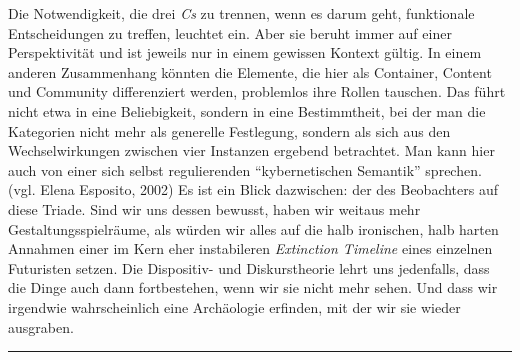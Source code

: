 \documentclass[output=paper]{langscibook}
\begin{document}
Die Notwendigkeit, die drei \emph{Cs} zu trennen, wenn es darum geht,
funktionale Entscheidungen zu treffen, leuchtet ein. Aber sie beruht
immer auf einer Perspektivität und ist jeweils nur in einem gewissen
Kontext gültig. In einem anderen Zusammenhang könnten die Elemente, die
hier als Container, Content und Community differenziert werden,
problemlos ihre Rollen tauschen. Das führt nicht etwa in eine
Beliebigkeit, sondern in eine Bestimmtheit, bei der man die Kategorien
nicht mehr als generelle Festlegung, sondern als sich aus den
Wechselwirkungen zwischen vier Instanzen ergebend betrachtet. Man kann
hier auch von einer sich selbst regulierenden \enquote{kybernetischen
Semantik} sprechen. (vgl. Elena Esposito, 2002) Es ist ein Blick
dazwischen: der des Beobachters auf diese Triade. Sind wir uns dessen
bewusst, haben wir weitaus mehr Gestaltungsspielräume, als würden wir
alles auf die halb ironischen, halb harten Annahmen einer im Kern eher
instabileren \emph{Extinction Timeline} eines einzelnen Futuristen
setzen. Die Dispositiv- und Diskurstheorie lehrt uns jedenfalls, dass
die Dinge auch dann fortbestehen, wenn wir sie nicht mehr sehen. Und
dass wir irgendwie wahrscheinlich eine Archäologie erfinden, mit der wir
sie wieder ausgraben.

\begin{center}\rule{0.5\linewidth}{0.5pt}\end{center}
\end{document}
